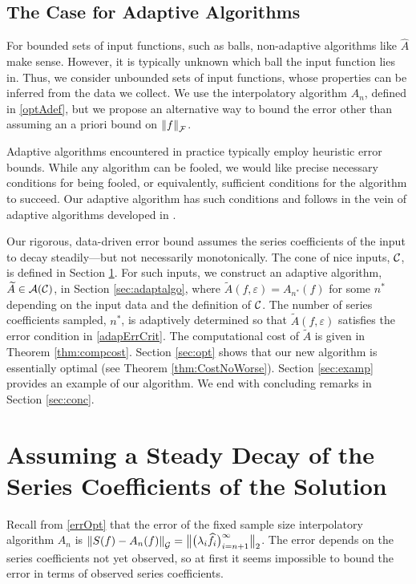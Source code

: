 \documentclass[graybox,footinfo]{svmult}
\newcommand{\DHJRnorm}[2][{}]{\ensuremath{\left \lVert #2 \right \rVert}_{#1}}
\newcommand{\DHJRbignorm}[2][{}]{\ensuremath{\bigl \lVert #2 \bigr \rVert}_{#1}}
\begin{document}
\subsection{The Case for Adaptive Algorithms}
For bounded sets of input functions, such as balls, non-adaptive algorithms like $\widehat{A}$ make sense.  However, it is typically unknown which ball the input function lies in.  Thus, we consider unbounded sets of input functions, whose properties can be inferred from the data we collect.  We use the interpolatory algorithm $A_n$, defined in \eqref{optAdef}, but we propose an alternative way to bound the error other than assuming an a priori bound on $\DHJRnorm[\calF]{f}$.

Adaptive algorithms encountered in practice typically employ heuristic error bounds.  While any algorithm can be fooled, we would like precise necessary conditions for being fooled, or equivalently, sufficient conditions for the algorithm to succeed.  Our adaptive algorithm has such conditions and follows in the vein of adaptive algorithms developed in \cite{HicEtal14a, HIcEtal14b, HicJim16a, JimHic16a}.

Our rigorous, data-driven error bound assumes the series coefficients of the input to decay steadily---but not necessarily monotonically.  The cone of nice inputs, ${\mathcal{C}}$, is defined in Section \ref{sec:cone}.  For such inputs, we construct an adaptive algorithm, $\widetilde{A} \in {\mathcal{A}}({\mathcal{C}})$, in Section \ref{sec:adaptalgo},  where $\widetilde{A}(f,\varepsilon) = A_{n^*}(f)$ for some $n^*$ depending on the input data and the definition of ${\mathcal{C}}$.  The number of series coefficients sampled, $n^*$, is adaptively determined so that $\widetilde{A}(f,\varepsilon)$ satisfies the error condition in \eqref{adapErrCrit}.  The computational cost of $\widetilde{A}$ is given in  Theorem \ref{thm:compcost}.  Section \ref{sec:opt} shows that our new algorithm is essentially optimal (see Theorem \ref{thm:CostNoWorse}).  Section \ref{sec:examp} provides an example of our algorithm.  We end with concluding remarks in Section \ref{sec:conc}. 




\section{Assuming a Steady Decay of the Series Coefficients of the Solution} \label{sec:cone}

Recall from \eqref{errOpt} that the error of the fixed sample size interpolatory algorithm $A_n$ is $\DHJRnorm[\calG]{S(f) - A_n(f)} = \DHJRbignorm[2]{\bigl(\lambda_{i} \widehat{f}_{i} \bigr)_{i= n+1}^{\infty}}$.  The error depends on the series coefficients not yet observed, so at first it seems impossible to bound the error in terms of observed series coefficients.  
\end{document}
